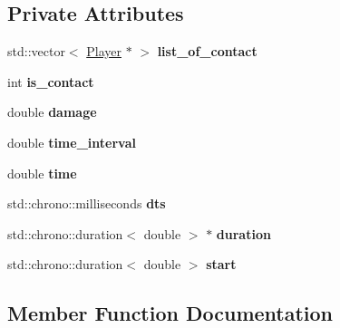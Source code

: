 \subsection*{Private Attributes}
\begin{DoxyCompactItemize}
\item 
\mbox{\label{class_danger_object_a3b032f295d584177435e4ee71e8a0647}} 
std\+::vector$<$ \hyperlink{class_player}{Player} $\ast$ $>$ {\bfseries list\+\_\+of\+\_\+contact}
\item 
\mbox{\label{class_danger_object_aaa4d163e7501c8028ef02a6a30dd8ad4}} 
int {\bfseries is\+\_\+contact}
\item 
\mbox{\label{class_danger_object_a81602fd52def64c26dd7ae488d523111}} 
double {\bfseries damage}
\item 
\mbox{\label{class_danger_object_a1a5e8ba303583a6a1dae79b218e07f6f}} 
double {\bfseries time\+\_\+interval}
\item 
\mbox{\label{class_danger_object_a47bc7031c9d5afd3dffc902e464e6911}} 
double {\bfseries time}
\item 
\mbox{\label{class_danger_object_a2cb289f3bf483c5e73282342ced2bd77}} 
std\+::chrono\+::milliseconds {\bfseries dts}
\item 
\mbox{\label{class_danger_object_a4bb9e8dffdc1815094e867824ea4e393}} 
std\+::chrono\+::duration$<$ double $>$ $\ast$ {\bfseries duration}
\item 
\mbox{\label{class_danger_object_aa56801b799fc9193bb3ae64c400aa614}} 
std\+::chrono\+::duration$<$ double $>$ {\bfseries start}
\end{DoxyCompactItemize}


\subsection{Member Function Documentation}
\mbox{\label{class_danger_object_aebfc6b5b3dc2452cae78b157a29e8824}} 
